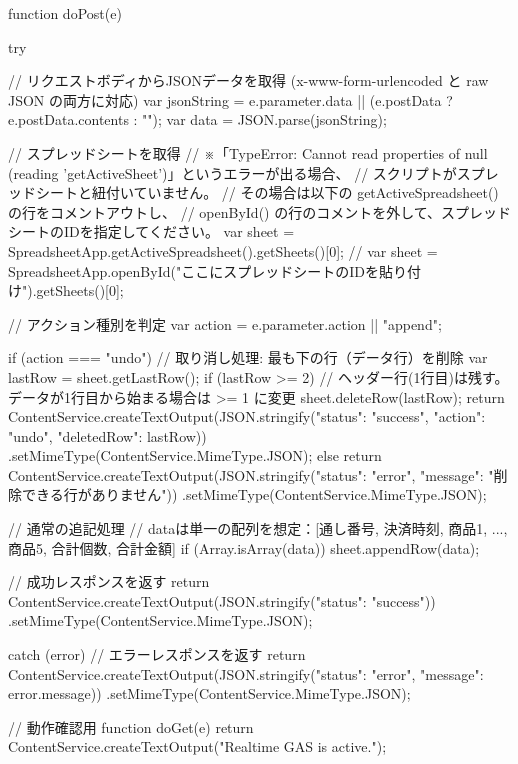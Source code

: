 function doPost(e) {
  try {
    // リクエストボディからJSONデータを取得 (x-www-form-urlencoded と raw JSON の両方に対応)
    var jsonString = e.parameter.data || (e.postData ? e.postData.contents : "");
    var data = JSON.parse(jsonString);
    
    // スプレッドシートを取得
    // ※「TypeError: Cannot read properties of null (reading 'getActiveSheet')」というエラーが出る場合、
    // スクリプトがスプレッドシートと紐付いていません。
    // その場合は以下の getActiveSpreadsheet() の行をコメントアウトし、
    // openById() の行のコメントを外して、スプレッドシートのIDを指定してください。
    var sheet = SpreadsheetApp.getActiveSpreadsheet().getSheets()[0];
    // var sheet = SpreadsheetApp.openById("ここにスプレッドシートのIDを貼り付け").getSheets()[0];
    
    // アクション種別を判定
    var action = e.parameter.action || "append";
    
    if (action === "undo") {
      // 取り消し処理: 最も下の行（データ行）を削除
      var lastRow = sheet.getLastRow();
      if (lastRow >= 2) { // ヘッダー行(1行目)は残す。データが1行目から始まる場合は >= 1 に変更
        sheet.deleteRow(lastRow);
        return ContentService.createTextOutput(JSON.stringify({"status": "success", "action": "undo", "deletedRow": lastRow}))
          .setMimeType(ContentService.MimeType.JSON);
      } else {
        return ContentService.createTextOutput(JSON.stringify({"status": "error", "message": "削除できる行がありません"}))
          .setMimeType(ContentService.MimeType.JSON);
      }
    }
    
    // 通常の追記処理
    // dataは単一の配列を想定：[通し番号, 決済時刻, 商品1, ..., 商品5, 合計個数, 合計金額]
    if (Array.isArray(data)) {
      sheet.appendRow(data);
    }
    
    // 成功レスポンスを返す
    return ContentService.createTextOutput(JSON.stringify({"status": "success"}))
      .setMimeType(ContentService.MimeType.JSON);
      
  } catch (error) {
    // エラーレスポンスを返す
    return ContentService.createTextOutput(JSON.stringify({"status": "error", "message": error.message}))
      .setMimeType(ContentService.MimeType.JSON);
  }
}

// 動作確認用
function doGet(e) {
  return ContentService.createTextOutput("Realtime GAS is active.");
}
